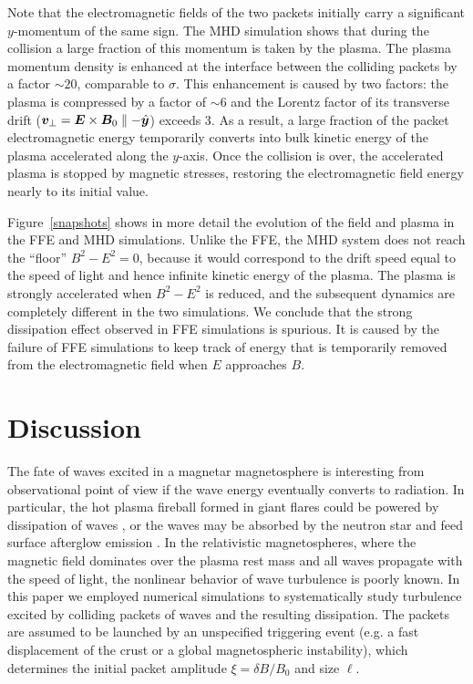 Note that the electromagnetic fields of the two packets initially carry a significant $y$-momentum of the same sign. The MHD simulation shows that during the collision a large fraction of this momentum is taken by the plasma. The plasma momentum density is enhanced at the interface between the colliding packets by a factor $\sim 20$, comparable to $\sigma$. This enhancement is caused by two factors: the plasma is compressed by a factor of $\sim 6$ and the Lorentz factor of its transverse drift ($\boldsymbol{v}_\perp=\boldsymbol{E}\times\boldsymbol{B}_0\parallel -\hat{\boldsymbol{y}}$) exceeds 3.
As a result, a large fraction of the packet electromagnetic energy temporarily converts into bulk kinetic energy of the plasma accelerated along the $y$-axis.
Once the collision is over, the accelerated plasma is stopped by magnetic stresses, restoring the electromagnetic field energy nearly to its initial value. 

Figure~\ref{snapshots} shows in more detail the evolution of the field and plasma in the FFE and MHD simulations.
Unlike the FFE, the MHD system does not reach the ``floor'' $B^2-E^2=0$, because it would correspond to the drift speed equal to the speed of light and hence infinite kinetic energy of the plasma. The plasma is strongly accelerated when $B^2-E^2$ is reduced, and the subsequent dynamics are completely different in the two simulations.
We conclude that the strong dissipation effect observed in FFE simulations is spurious. It is caused by the failure of FFE simulations to keep track of energy that is temporarily removed from the electromagnetic field when $E$ approaches $B$.

\section{Discussion}\label{sec:discussion}
%

The fate of \alfven waves excited in a magnetar magnetosphere is interesting from observational point of view if the wave energy eventually converts to radiation.  In particular, the hot plasma fireball formed in giant flares could be powered by dissipation of waves \citep{1995MNRAS.275..255T}, or the waves may be absorbed by the neutron star and feed surface afterglow emission \citep{2015ApJ...815...25L}. In the relativistic magnetospheres, where the magnetic field dominates over the plasma rest mass and all waves propagate with the speed of light, the nonlinear behavior of wave turbulence is poorly known. In this paper we employed numerical simulations to systematically study turbulence excited by colliding packets of \alfven waves and the resulting dissipation. The packets are assumed to be launched by an unspecified triggering event (e.g. a fast displacement of the crust or a global magnetospheric instability), which determines the initial packet amplitude $\xi = \delta B / B_0$ and size $\ell$.


